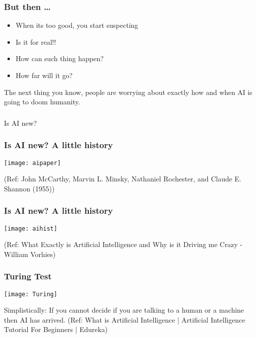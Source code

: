 \begin{frame}[fragile]\frametitle{But then \ldots}
\begin{itemize}
\item When its too good, you start suspecting
\item Is it for real!!
\item How can such thing happen?
\item How far will it go?
\end{itemize}
The next thing you know, people are worrying about exactly how and when AI is going to doom humanity.
\end{frame}

\begin{frame}[fragile]\frametitle{}
\begin{center}
{\Large Is AI new?}
\end{center}
\end{frame}



\begin{frame}[fragile]\frametitle{Is AI new? A little history}
\begin{center}
\texttt{[image: aipaper]}
\end{center}
{\tiny (Ref:  John McCarthy, Marvin L. Minsky, Nathaniel Rochester, and Claude E. Shannon (1955))}
\end{frame}

\begin{frame}[fragile]\frametitle{Is AI new? A little history}
\begin{center}
\texttt{[image: aihist]}
\end{center}
{\tiny (Ref:  What Exactly is Artificial Intelligence and Why is it Driving me Crazy - William Vorhies)}
\end{frame}

\begin{frame}[fragile]\frametitle{Turing Test}
\begin{center}
\texttt{[image: Turing]}
\end{center}
Simplistically: If you cannot decide if you are talking to a human or a machine then AI has arrived.
{\tiny (Ref:  What is Artificial Intelligence | Artificial Intelligence Tutorial For Beginners | Edureka)}
\end{frame}


